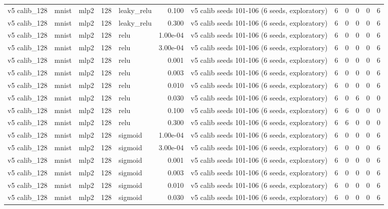 \begin{table}[htbp]
{\begin{tabular}{@{}lllrlrlrrrrr@{}}
v5 calib\_128 & mnist & mlp2 & 128 & leaky\_relu & 0.100 & v5 calib seeds 101-106 (6 seeds, exploratory) & 6 & 0 & 0 & 0 & 6 \\
v5 calib\_128 & mnist & mlp2 & 128 & leaky\_relu & 0.300 & v5 calib seeds 101-106 (6 seeds, exploratory) & 6 & 0 & 0 & 0 & 6 \\
v5 calib\_128 & mnist & mlp2 & 128 & relu & 1.00e-04 & v5 calib seeds 101-106 (6 seeds, exploratory) & 6 & 0 & 0 & 0 & 6 \\
v5 calib\_128 & mnist & mlp2 & 128 & relu & 3.00e-04 & v5 calib seeds 101-106 (6 seeds, exploratory) & 6 & 0 & 0 & 0 & 6 \\
v5 calib\_128 & mnist & mlp2 & 128 & relu & 0.001 & v5 calib seeds 101-106 (6 seeds, exploratory) & 6 & 0 & 0 & 0 & 6 \\
v5 calib\_128 & mnist & mlp2 & 128 & relu & 0.003 & v5 calib seeds 101-106 (6 seeds, exploratory) & 6 & 0 & 0 & 0 & 6 \\
v5 calib\_128 & mnist & mlp2 & 128 & relu & 0.010 & v5 calib seeds 101-106 (6 seeds, exploratory) & 6 & 0 & 0 & 0 & 6 \\
v5 calib\_128 & mnist & mlp2 & 128 & relu & 0.030 & v5 calib seeds 101-106 (6 seeds, exploratory) & 6 & 0 & 6 & 0 & 0 \\
v5 calib\_128 & mnist & mlp2 & 128 & relu & 0.100 & v5 calib seeds 101-106 (6 seeds, exploratory) & 6 & 6 & 0 & 0 & 0 \\
v5 calib\_128 & mnist & mlp2 & 128 & relu & 0.300 & v5 calib seeds 101-106 (6 seeds, exploratory) & 6 & 6 & 0 & 0 & 0 \\
v5 calib\_128 & mnist & mlp2 & 128 & sigmoid & 1.00e-04 & v5 calib seeds 101-106 (6 seeds, exploratory) & 6 & 0 & 0 & 0 & 6 \\
v5 calib\_128 & mnist & mlp2 & 128 & sigmoid & 3.00e-04 & v5 calib seeds 101-106 (6 seeds, exploratory) & 6 & 0 & 0 & 0 & 6 \\
v5 calib\_128 & mnist & mlp2 & 128 & sigmoid & 0.001 & v5 calib seeds 101-106 (6 seeds, exploratory) & 6 & 0 & 0 & 0 & 6 \\
v5 calib\_128 & mnist & mlp2 & 128 & sigmoid & 0.003 & v5 calib seeds 101-106 (6 seeds, exploratory) & 6 & 0 & 0 & 0 & 6 \\
v5 calib\_128 & mnist & mlp2 & 128 & sigmoid & 0.010 & v5 calib seeds 101-106 (6 seeds, exploratory) & 6 & 0 & 0 & 0 & 6 \\
v5 calib\_128 & mnist & mlp2 & 128 & sigmoid & 0.030 & v5 calib seeds 101-106 (6 seeds, exploratory) & 6 & 0 & 0 & 0 & 6 \\

\end{tabular}}
\end{table}
